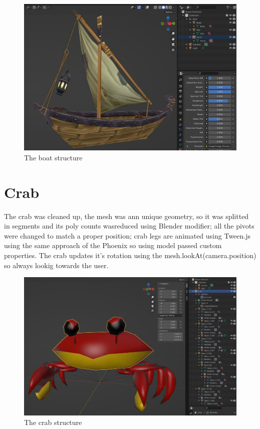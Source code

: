 \documentclass[10pt,a4paper]{article}
\begin{document}
\begin{center}
\begin{figure}[H]
\caption{The boat structure}
\includegraphics[width=1\textwidth]{boat}
\end{figure}
\end{center}


\section{Crab}

The crab was cleaned up, the mesh was ann unique geometry, so it was splitted in segments and its poly counts  wasreduced using Blender modifier; all the pivots were changed to match a proper position; crab legs are animated using Tween.js using the same approach of the Phoenix so using model passed custom properties. The crab updates it's rotation using the mesh.lookAt(camera.position) so always lookig towards the user.

\begin{center}
\begin{figure}[H]
\caption{The crab structure}
\includegraphics[width=1\textwidth]{crab}
\end{figure}
\end{center}
\end{document}

